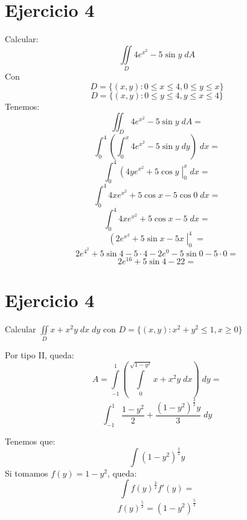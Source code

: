 \documentclass{article}
\begin{document}
\section*{Ejercicio 4}
Calcular:
\[\iint\limits_D 4e^{x^2} - 5 \sin y \; dA\]
Con
\[D = \{(x,y) : 0 \leq x \leq 4, 0 \leq y \leq x\}\]
\[D = \{(x,y) : 0 \leq y \leq 4, y \leq x \leq 4\}\]
Tenemos:
\[\iint_D 4e^{x^2} - 5\sin y \; dA =\]
\[
	\int_0^4 \left(\int_0^x 4e^{x^2} - 5 \sin y \; dy\right) \; dx =
\]
\[
	\int_0^4 \left(4ye^{x^2} + 5 \cos y \;\right|_0^x \; dx =
\]
\[
	\int_0^4 4xe^{x^2} + 5 \cos x - 5 \cos 0  \; dx =
\]
\[
	\int_0^4 4xe^{x^2} + 5 \cos x - 5 \; dx =
\]
\[
	\left( 2e^{x^2} + 5 \sin x - 5x \; \right|_0^4 \; =
\]
\[
	2e^{4^2} + 5 \sin 4 - 5 \cdot 4 - 2e^0 - 5 \sin 0 - 5 \cdot 0 =
\]
\[
	2e^{16} + 5 \sin 4 - 22 =
\]

\section*{Ejercicio 4}
Calcular $\iint\limits_D x + x^2y \; dx \; dy$ con $D = \{(x,y) : x^2 + y^2 \leq 1, x \geq 0\}$

Por tipo II, queda:
\[A = \int\limits_{-1}^1\left(\int\limits_0^{\sqrt{1 - y^2}} x + x^2y \; dx \right) \; dy =\]
\[\int_{-1}^1 \frac{1-y^2}{2} + \frac{(1 - y^2)^{\frac{3}{2}} y}{3} \; dy\]

Tenemos que:
\[\int (1-y^2)^\frac{3}{2} y\]
Si tomamos $f(y) = 1 - y^2$, queda:
\[\int f(y)^\frac{3}{2} f'(y) =\]
\[f(y)^\frac{5}{2} = (1 - y^2)^\frac{5}{2}\]
\end{document}
